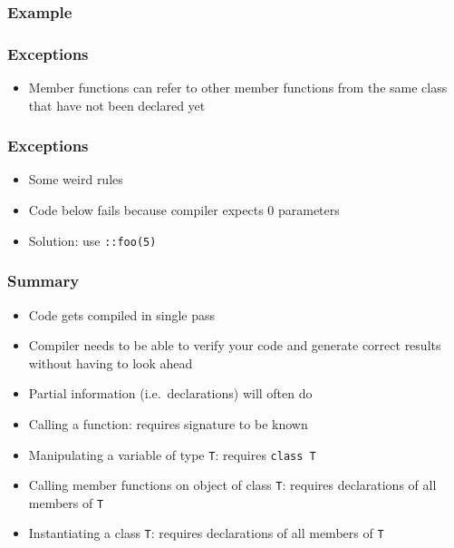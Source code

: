 \begin{frame}
  \frametitle{Example}
  \begin{overprint}
  \end{overprint}
\end{frame}

\begin{frame}
  \frametitle{Exceptions}
  \begin{itemize}
    \item Member functions can refer to other member functions
          from the same class that have not been declared yet
  \end{itemize}
\end{frame}

\begin{frame}
  \frametitle{Exceptions}
  \begin{itemize}
    \item Some weird rules
    \item Code below fails because compiler expects 0 parameters
    \item Solution: use {\tt ::foo(5)}
  \end{itemize}
\end{frame}

\begin{frame}
  \frametitle{Summary}
  \begin{itemize}
    \item Code gets compiled in single pass
    \item Compiler needs to be able to verify your code and generate correct results without having to look ahead
    \item Partial information (i.e.\ declarations) will often do
  \end{itemize}
  \vskip5mm
  \begin{itemize}
    \item Calling a function: requires signature to be known
    \item Manipulating a variable of type {\tt T}: requires {\tt class T}
    \item Calling member functions on object of class {\tt T}: requires declarations of all members of {\tt T}
    \item Instantiating a class {\tt T}: requires declarations of all members of {\tt T}
  \end{itemize}
\end{frame}





